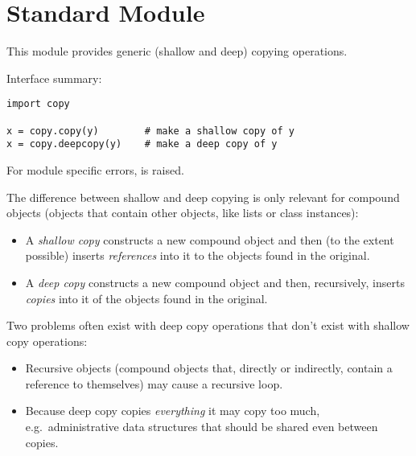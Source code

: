 \section{Standard Module }



This module provides generic (shallow and deep) copying operations.

Interface summary:

\begin{verbatim}
import copy

x = copy.copy(y)        # make a shallow copy of y
x = copy.deepcopy(y)    # make a deep copy of y
\end{verbatim}
%
For module specific errors,  is raised.

The difference between shallow and deep copying is only relevant for
compound objects (objects that contain other objects, like lists or
class instances):

\begin{itemize}

\item
A \emph{shallow copy} constructs a new compound object and then (to the
extent possible) inserts \emph{references} into it to the objects found
in the original.

\item
A \emph{deep copy} constructs a new compound object and then,
recursively, inserts \emph{copies} into it of the objects found in the
original.

\end{itemize}

Two problems often exist with deep copy operations that don't exist
with shallow copy operations:

\begin{itemize}

\item
Recursive objects (compound objects that, directly or indirectly,
contain a reference to themselves) may cause a recursive loop.

\item
Because deep copy copies \emph{everything} it may copy too much, e.g.\
administrative data structures that should be shared even between
copies.

\end{itemize}

